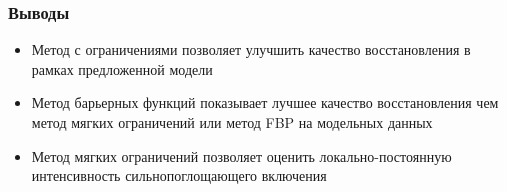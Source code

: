 \begin{frame}
\frametitle{Выводы}
\begin{itemize}
  \item Метод с ограничениями позволяет улучшить качество восстановления в рамках предложенной модели
  \item Метод барьерных функций показывает лучшее качество восстановления чем метод мягких ограничений или метод FBP на модельных данных
  \item Метод мягких ограничений позволяет оценить локально-постоянную интенсивность сильнопоглощающего включения
\end{itemize}
\end{frame}